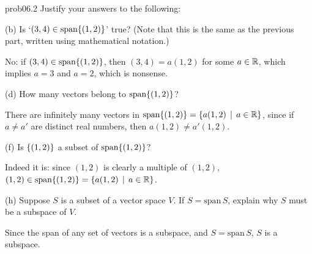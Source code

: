 \begin{sol}{prob06.2}  Justify your answers to the following:
\medskip

(b) Is  `$(3,4) \in\textrm{span}\{(1,2)\} $' true? (Note that this is the same as the previous part, written using mathematical notation.)

\soln No: if $(3,4) \in\textrm{span}\{(1,2)\} $, then $(3,4)=a (1,2)$ for some $a\in \mathbb{R}$, which implies $a=3$ and $a=2$, which is nonsense.
\medskip

(d) How many vectors belong to $\textrm{span}\{(1,2)\}$?

\soln There are infinitely many vectors in $\textrm{span}\{(1,2)\}= \{a(1,2)\,\mid \, a\in \mathbb{R} \}$, since if $a\not= a'$ are distinct real numbers, then $a(1,2)\not=a'(1,2)$.

\medskip

(f) Is  $\{(1,2) \}$ a subset of  $\textrm{span}\{(1,2)\}$?

\soln Indeed it is: since  $(1,2)$ is clearly a multiple of $(1,2)$, $(1,2) \in \textrm{span}\{(1,2)\} =\{a(1,2)\,\mid \, a\in \mathbb{R} \}$.
\medskip

(h)  Suppose $S$ is a subset of a vector space $V$.  If $S= \text{span}\, S$,  explain why $S$ must be a subspace of $V$.

\soln Since the span of any set of vectors is a subspace, and $S= \text{span}\, S$, $S$ is a subspace.  
\medskip
%




\end{sol}

